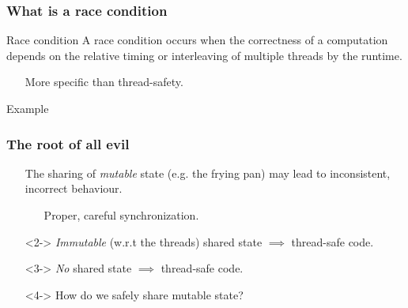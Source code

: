 \documentclass[xcolor={dvipsnames,svgnames},aspectratio=169]{beamer}
\begin{document}
\begin{frame}[fragile]
  \frametitle{What is a race condition}

  \begin{block}{Race condition}
    A race condition occurs when the correctness of a computation depends
    on the relative timing or interleaving of multiple threads by the runtime.
  \end{block}

  \begin{itemize}
  \item[\faBook] More specific than thread-safety.
  \end{itemize}

    \begin{block}{Example}
  \end{block}
\end{frame}

\begin{frame}[fragile]
  \frametitle{The root of all evil}

  \begin{itemize}
  \item[\faUserInjured] The sharing of \emph{mutable} state (e.g. the frying pan) may
    lead to inconsistent, incorrect behaviour.
    \begin{itemize}
    \item[\faBriefcaseMedical] Proper, careful synchronization.
    \end{itemize}
  \item[\faBook]<2-> \emph{Immutable}  (w.r.t the threads) shared state
    $\implies$ thread-safe code.
  \item[\faBook]<3-> \emph{No} shared state $\implies$ thread-safe code.
  \end{itemize}

  \begin{itemize}
  \item[\faSearch]<4-> How do we safely share mutable state?
  \end{itemize}

\end{frame}
\end{document}
